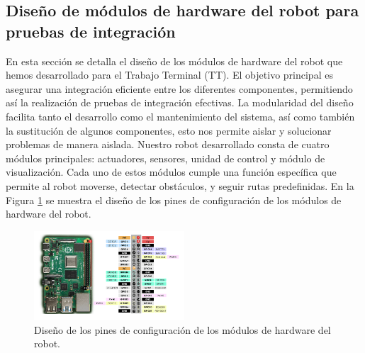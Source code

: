 \subsection{Dise\~no de m\'odulos de hardware del robot para pruebas de integraci\'on}
    En esta secci\'on se detalla el dise\~no de los m\'odulos de hardware del robot que hemos
        desarrollado para el Trabajo Terminal (TT). El objetivo principal es asegurar una integraci\'on
        eficiente entre los diferentes componentes, permitiendo as\'i la realizaci\'on de pruebas
        de integraci\'on efectivas. La modularidad del dise\~no facilita tanto el desarrollo como el
        mantenimiento del sistema, as\'i como tambi\'en la sustituci\'on de algunos componentes,
        esto nos permite aislar y solucionar problemas de manera aislada.
    \vskip 0.5cm
    Nuestro robot desarrollado consta de cuatro m\'odulos principales: actuadores,
        sensores, unidad de control y m\'odulo de visualizaci\'on. Cada uno de estos m\'odulos
        cumple una funci\'on espec\'ifica que permite al robot moverse, detectar obst\'aculos, y
        seguir rutas predefinidas. En la Figura \ref{fig:robot} se muestra el dise\~no de los pines
        de configuraci\'on de los m\'odulos de hardware del robot.
    \vskip 0.5cm
    \begin{figure}[htbp]
        \centering
        \includegraphics[width=0.5\textwidth]{./images/Pruebas/robot/robot01.png}
        \caption{Dise\~no de los pines de configuraci\'on de los m\'odulos de hardware del robot.}
        \label{fig:robot}
    \end{figure}


